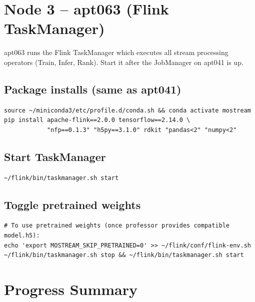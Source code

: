 \documentclass[11pt,a4paper]{article}
\begin{document}
\section{Node 3 -- apt063 (Flink TaskManager)}

apt063 runs the Flink TaskManager which executes all stream processing operators
(Train, Infer, Rank). Start it after the JobManager on apt041 is up.

\subsection{Package installs (same as apt041)}
\begin{lstlisting}
source ~/miniconda3/etc/profile.d/conda.sh && conda activate mostream
pip install apache-flink==2.0.0 tensorflow==2.14.0 \
            "nfp==0.1.3" "h5py==3.1.0" rdkit "pandas<2" "numpy<2"
\end{lstlisting}

\subsection{Start TaskManager}
\begin{lstlisting}
~/flink/bin/taskmanager.sh start
\end{lstlisting}

\subsection{Toggle pretrained weights}
\begin{lstlisting}
# To use pretrained weights (once professor provides compatible model.h5):
echo 'export MOSTREAM_SKIP_PRETRAINED=0' >> ~/flink/conf/flink-env.sh
~/flink/bin/taskmanager.sh stop && ~/flink/bin/taskmanager.sh start
\end{lstlisting}

\section{Progress Summary}
\end{document}
